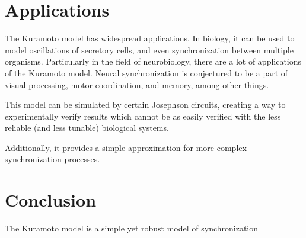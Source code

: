 \documentclass[12pt]{article}
\begin{document}
\section{Applications}
The Kuramoto model has widespread applications. In biology, it can be used to model oscillations of secretory cells, and even synchronization between multiple organisms\cite{winfree1967biological}. Particularly in the field of neurobiology, there are a lot of applications of the Kuramoto model\cite{breakspear2010generative}\cite{cumin2007generalising}. Neural synchronization is conjectured to be a part of visual processing\cite{sompolinsky1991cooperative}, motor coordination\cite{cassidy2002movement}, and memory\cite{klimesch1996memory}, among other things.

This model can be simulated by certain Josephson circuits\cite{wiesenfeld1998frequency}, creating a way to experimentally verify results which cannot be as easily verified with the less reliable (and less tunable) biological systems.

Additionally, it provides a simple approximation for more complex synchronization processes.
\section{Conclusion}
The Kuramoto model is a simple yet robust model of synchronization


\end{document}
